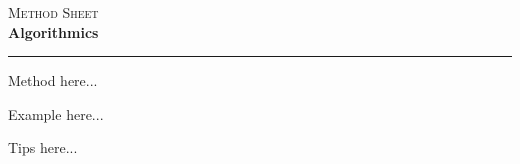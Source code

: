 \documentclass[12pt,a4paper]{article}
\begin{document}
\begin{center}
    {\scshape Method Sheet} \\
    \vspace{0.2cm}
    {\Large\bfseries Algorithmics} \\
    \rule{\linewidth}{1pt}
\end{center}



\begin{method}
    Method here...
\end{method}

\begin{example}
    Example here...
\end{example}

\begin{tips}
    Tips here... 
\end{tips}
\end{document}
